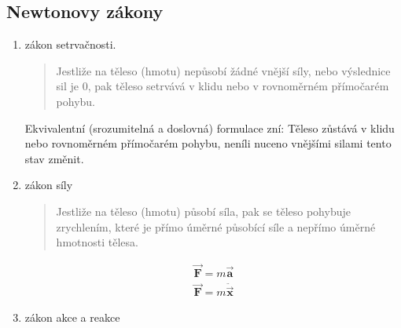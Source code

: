 \documentclass[letterpaper,10pt,english]{jupyterBook}
\begin{document}
\subsection{Newtonovy zákony}
\label{\detokenize{Prednasky/1_3_Dynamika_pohybu_v_1D:newtonovy-zakony}}\begin{enumerate}
%
\item {} 
\sphinxAtStartPar
{} \sphinxhyphen{} zákon setrvačnosti.
\begin{quote}

\sphinxAtStartPar
{}
\end{quote}
\begin{quote}

\sphinxAtStartPar
Jestliže na těleso (hmotu) nepůsobí žádné vnější síly, nebo výslednice sil je 0, pak těleso setrvává v klidu nebo v rovnoměrném přímočarém pohybu.
\end{quote}

\sphinxAtStartPar
Ekvivalentní (srozumitelná a doslovná) formulace zní: Těleso zůstává v klidu nebo rovnoměrném přímočarém pohybu, není\sphinxhyphen{}li nuceno vnějšími silami tento stav změnit.

\item {} 
\sphinxAtStartPar
{} \sphinxhyphen{} zákon síly
\begin{quote}

\sphinxAtStartPar
{}
\end{quote}
\begin{quote}

\sphinxAtStartPar
Jestliže na těleso (hmotu) působí síla, pak se těleso pohybuje zrychlením, které je přímo úměrné působící síle a nepřímo úměrné hmotnosti tělesa.
\end{quote}
\begin{equation*}
\begin{split}\vec{\mathbf{F}} = m  \vec{\mathbf{a}} \end{split}
\end{equation*}\begin{equation*}
\begin{split}\vec{\mathbf{F}} = m  \ddot{\vec{\mathbf{x}}} \end{split}
\end{equation*}
\item {} 
\sphinxAtStartPar
{} \sphinxhyphen{}  zákon akce a reakce
\begin{quote}


\end{quote}
\end{enumerate}
\end{document}
